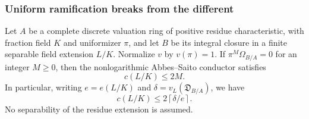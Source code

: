 \subsubsection{Uniform ramification breaks from the different}

\begin{lemma}
\label{D:different-conductor-bound}
Let $A$ be a complete discrete valuation ring of positive residue
characteristic, with fraction field $K$
and uniformizer $\pi$, and let $B$ be its integral closure in a finite
separable field extension $L/K$. Normalize $v$ by $v(\pi)=1$.
If $\pi^M\Omega_{B/A}=0$ for an integer $M\geq0$, then the
nonlogarithmic Abbes--Saito conductor satisfies
\[
                         c(L/K)\leq2M.                 \tag{D.UB.1}
\]
In particular, writing $e=e(L/K)$ and
$\delta=v_L(\mathfrak D_{B/A})$, we have
\[
                 c(L/K)\leq2\left\lceil\delta/e\right\rceil .
                                                        \tag{D.UB.2}
\]
No separability of the residue extension is assumed.
\end{lemma}

